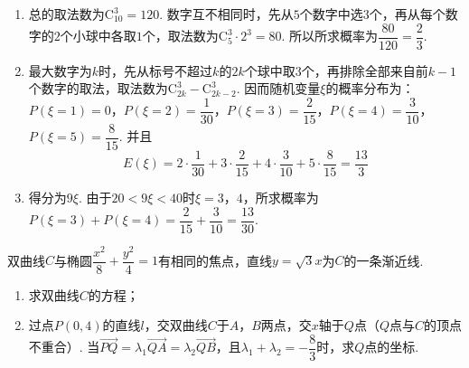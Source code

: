 \begin{solution}
\begin{enumerate}
\item 总的取法数为\(\mathrm C_{10}^{3}=120\). 数字互不相同时，先从\(5\)个数字中选\(3\)个，再从每个数字的\(2\)个小球中各取\(1\)个，取法数为\(\mathrm C_{5}^{3}\cdot2^3=80\).
所以所求概率为\(\dfrac{80}{120}=\dfrac23\).

\item 最大数字为\(k\)时，先从标号不超过\(k\)的\(2k\)个球中取\(3\)个，再排除全部来自前\(k-1\)个数字的取法，取法数为\(\mathrm C_{2k}^{3}-\mathrm C_{2k-2}^{3}\). 因而随机变量\(\xi\)的概率分布为：\(P(\xi=1)=0\)，\(P(\xi=2)=\dfrac1{30}\)，\(P(\xi=3)=\dfrac2{15}\)，\(P(\xi=4)=\dfrac3{10}\)，\(P(\xi=5)=\dfrac8{15}\).
并且
\[
E(\xi)
=2\cdot\frac1{30}+3\cdot\frac2{15}
 +4\cdot\frac3{10}+5\cdot\frac8{15}
=\frac{13}{3}
\]

\item 得分为\(9\xi\). 由于\(20<9\xi<40\)时\(\xi=3\)，\(4\)，所求概率为\(P(\xi=3)+P(\xi=4)=\dfrac2{15}+\dfrac3{10}=\dfrac{13}{30}\).
\end{enumerate}
\end{solution}

\begin{problem}
双曲线\(C\)与椭圆\(\dfrac{x^2}{8}+\dfrac{y^2}{4}=1\)有相同的焦点，直线\(y=\sqrt3x\)为\(C\)的一条渐近线.

\begin{enumerate}
\item 求双曲线\(C\)的方程；
\item 过点\(P(0,4)\)的直线\(l\)，交双曲线\(C\)于\(A\)，\(B\)两点，交\(x\)轴于\(Q\)点（\(Q\)点与\(C\)的顶点不重合）. 当\(\overrightarrow{PQ}=\lambda_1\overrightarrow{QA}=\lambda_2\overrightarrow{QB}\)，且\(\lambda_1+\lambda_2=-\dfrac83\)时，求\(Q\)点的坐标.
\end{enumerate}
\end{problem}

